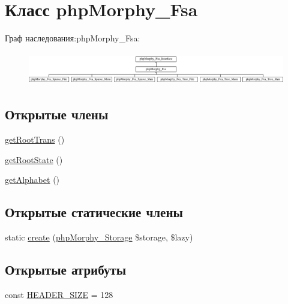 \hypertarget{classphpMorphy__Fsa}{
\section{Класс phpMorphy\_\-Fsa}
\label{classphpMorphy__Fsa}
}
Граф наследования:phpMorphy\_\-Fsa:\begin{figure}[H]
\begin{center}
\leavevmode
\includegraphics[height=1.443299cm]{classphpMorphy__Fsa}
\end{center}
\end{figure}
\subsection*{Открытые члены}
\begin{DoxyCompactItemize}
\item 
\hyperlink{classphpMorphy__Fsa_ae81385b292af9644586aabab4030a50e}{getRootTrans} ()
\item 
\hyperlink{classphpMorphy__Fsa_ad8aee8877dc44e5d77b6fd347d8e3ceb}{getRootState} ()
\item 
\hyperlink{classphpMorphy__Fsa_af1bc309ae78493942070ebab03587b60}{getAlphabet} ()
\end{DoxyCompactItemize}
\subsection*{Открытые статические члены}
\begin{DoxyCompactItemize}
\item 
static \hyperlink{classphpMorphy__Fsa_aa65502d2b676afec522dd0831a26c82c}{create} (\hyperlink{classphpMorphy__Storage}{phpMorphy\_\-Storage} \$storage, \$lazy)
\end{DoxyCompactItemize}
\subsection*{Открытые атрибуты}
\begin{DoxyCompactItemize}
\item 
const \hyperlink{classphpMorphy__Fsa_afd061cb6c86a2fb54b531d61419ed527}{HEADER\_\-SIZE} = 128
\end{DoxyCompactItemize}
